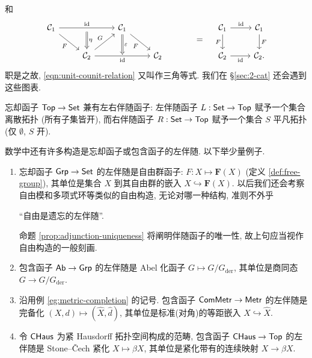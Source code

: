 \begin{remark}
	和
	\begin{equation*} \begin{tikzcd}
		\mathcal{C}_1 \arrow[rd, "F"'] \arrow[rr, "\identity", ""' name=I] & & \mathcal{C}_1 \arrow[Rightarrow, d, "\varepsilon"] \arrow[rd, "F"'] & & \\
		& \mathcal{C}_2 \arrow[ru, "G"] \arrow[Leftarrow, to path= --(I) \tikztonodes, "\eta"'] \arrow[rr, "\identity"'] & {} & \mathcal{C}_2
	\end{tikzcd} \quad = \quad \begin{tikzcd}
		\mathcal{C}_1 \arrow[r, "\identity"] \arrow[d, "F"'] & \mathcal{C}_1 \arrow[d, "F"] \\
		\mathcal{C}_2 \arrow[r, "\identity"'] & \mathcal{C}_2 .
	\end{tikzcd} \end{equation*}
	职是之故, \eqref{eqn:unit-counit-relation} 又叫作三角等式. 我们在 \S\ref{sec:2-cat} 还会遇到这些图表. 
\end{remark}

\begin{example}\label{eg:top-adjunction}
	忘却函子 $\mathsf{Top} \to \mathsf{Set}$ 兼有左右伴随函子:  左伴随函子 $L: \mathsf{Set} \to \mathsf{Top}$ 赋予一个集合离散拓扑 (所有子集皆开), 而右伴随函子 $R: \mathsf{Set} \to \mathsf{Top}$ 赋予一个集合 $S$ 平凡拓扑 (仅 $\emptyset$, $S$ 开).
\end{example}

\begin{example}\label{eg:forgetful-adjunction}
	数学中还有许多构造是忘却函子或包含函子的左伴随. 以下举少量例子.
	\begin{enumerate}
		\item 忘却函子 $\mathsf{Grp} \to \mathsf{Set}$ 的左伴随是自由群函子: $F: X \mapsto \mathbf{F}(X)$ (定义 \ref{def:free-group}), 其单位是集合 $X$ 到其自由群的嵌入 $X \hookrightarrow \mathbf{F}(X)$. 以后我们还会考察自由模和多项式环等类似的自由构造, 无论对哪一种结构, 准则不外乎
		\begin{center}
			``自由是遗忘的左伴随''.
		\end{center}
		命题 \ref{prop:adjunction-uniqueness} 将阐明伴随函子的唯一性, 故上句应当视作自由构造的一般刻画.
		\item 包含函子 $\mathsf{Ab} \to \mathsf{Grp}$ 的左伴随是 Abel 化函子 $G \mapsto G/G_\text{der}$, 其单位是商同态 $G \to G/G_\text{der}$.
		\item 沿用例 \ref{eg:metric-completion} 的记号. 包含函子 $\mathsf{ComMetr} \to \mathsf{Metr}$ 的左伴随是完备化 $(X, d) \mapsto (\hat{X}, \hat{d})$, 其单位是标准(对角)的等距嵌入 $X \hookrightarrow \hat{X}$.
		\item 令 $\mathsf{CHaus}$ 为紧 Hausdorff 拓扑空间构成的范畴, 包含函子 $\mathsf{CHaus} \to \mathsf{Top}$ 的左伴随是 Stone--Čech 紧化 $X \mapsto \beta X$, 其单位是紧化带有的连续映射 $X \to \beta X$.
	\end{enumerate}
\end{example}

